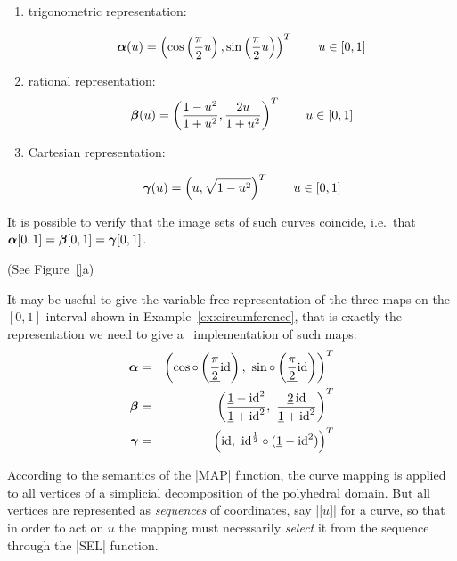\begin{coding}[Algebraic computation of FE = $\delta_1$]
{\begin{condition}
\begin{enumerate}
\item  trigonometric representation:

\[
{\mbox{\boldmath $\alpha$}}(u) = \left(\cos \left({\pi \over 2}u\right), \sin \left({\pi \over
2}u\right)\right)^T \qquad u\in[0,1]
\]

\item  rational representation:
\[
{\mbox{\boldmath $\beta$}}(u) = \left({1-u^2 \over 1+u^2}, {2u \over 1+u^2}\right)^T
\qquad u\in[0,1]
\]


\item  Cartesian representation:

\[
{\mbox{\boldmath $\gamma$}}(u) = \left(u, \sqrt{1-u^2}\right)^T
\qquad u\in[0,1]
\]

\end{enumerate}

It is possible to verify that the image sets of such curves coincide, 
i.e.~that ${\mbox{\boldmath $\alpha$}}[0,1]={\mbox{\boldmath $\beta$}}[0,1]={\mbox{\boldmath $\gamma$}}[0,1]$.

\end{condition}


\begin{condition} (See Figure~\ref{}a)
\label{ex:5:4:freearc}
  
It may be useful to give the variable-free representation of the three
maps on the $[0,1]$ interval shown in Example~\ref{ex:circumference},
that is exactly the representation we need to give a \pl\
implementation of such maps:
\begin{eqnarray}
{\mbox{\boldmath $\alpha$}} &=& \left(\cos \circ \left( \underline{\pi \over 2} 
\textrm{id}\right), \
\sin \circ \left( \underline{\pi \over 2} \textrm{id} \right) \right)^T
\\
{\mbox{\boldmath $\beta$}} &=& \left(\frac{\underline{1} - 
\textrm{id}^2 }{ \underline{1}+ \textrm{id}^2}, \
{\underline{2} \,\textrm{id} \over \underline{1}+ \textrm{id}^2} 
\right)^T
\\
{\mbox{\boldmath $\gamma$}} &=& \left( \textrm{id}, \ \textrm{id}^{1\over 2}\circ 
(\underline{1}- \textrm{id}^2) \right)^T
\label{eq:5:alpha}
\end{eqnarray}

According to the semantics of the |MAP| function, the curve
mapping is applied to all vertices of a simplicial decomposition of
the polyhedral domain.  But all vertices are represented as
\emph{sequences} of coordinates, say |[$u$]| for a curve, so
that in order to act on $u$ the mapping must necessarily \emph{select}
it from the sequence through the |SEL| function.


\end{condition}}
\end{coding}

